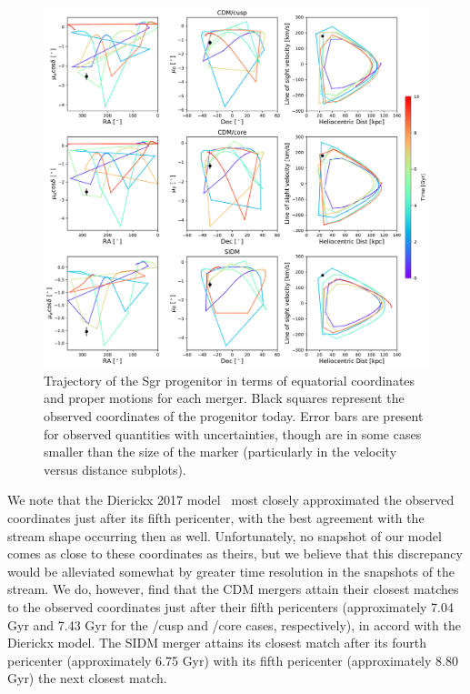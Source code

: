 \begin{figure}
    \centering
    \includegraphics[width=1.0\linewidth]{figs/equatorial_progenitor.pdf}
    \caption{%
        Trajectory of the Sgr progenitor in terms of equatorial coordinates and
        proper motions for each merger. Black squares represent the observed
        coordinates of the progenitor today. Error bars are present for observed
        quantities with uncertainties, though are in some cases smaller than
        the size of the marker (particularly in the velocity versus distance
        subplots).
    }
    \label{fig:eq_prog}
\end{figure}

We note that the Dierickx 2017 model~\cite{dierickx_predicted_2017} most
closely approximated the observed coordinates just after its fifth pericenter,
with the best agreement with the stream shape occurring then as well.
Unfortunately, no snapshot of our model comes as close to these coordinates as
theirs, but we believe that this discrepancy would be alleviated somewhat by
greater time resolution in the snapshots of the stream.  We do, however, find
that the CDM mergers attain their closest matches to the observed coordinates
just after their fifth pericenters (approximately 7.04 Gyr and 7.43 Gyr for
the /cusp and /core cases, respectively), in accord with the Dierickx model.
The SIDM merger attains its closest match after its fourth pericenter
(approximately 6.75 Gyr) with its fifth pericenter (approximately 8.80 Gyr)
the next closest match.


